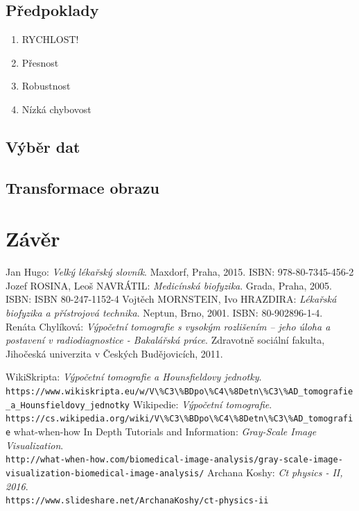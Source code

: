 \documentclass{thesis}%
\begin{document}
\section{Předpoklady}
\begin{enumerate}
\item RYCHLOST!
\item Přesnost
\item Robustnost
\item Nízká chybovost
\end{enumerate}
\section{Výběr dat }
\section{Transformace obrazu}


\chapter{Závěr}

\newpage
\listoffigures
\listoftables

\begin{thebibliography}{DUSO}
   Jan Hugo:
    \emph{Velký lékařský slovník}. Maxdorf, Praha, 2015. ISBN: 978-80-7345-456-2 
   Jozef ROSINA, Leoš NAVRÁTIL:
    \emph{Medicínská biofyzika}. Grada, Praha, 2005. ISBN: ISBN 80-247-1152-4
  Vojtěch MORNSTEIN, Ivo HRAZDIRA:
    \emph{Lékařská biofyzika a přístrojová technika}. Neptun, Brno, 2001. ISBN: 80-902896-1-4.
  Renáta Chylíková:
    \emph{Výpočetní tomografie s vysokým rozlišením – jeho úloha a postavení v radiodiagnostice - Bakalářská práce}. Zdravotně sociální fakulta, Jihočeská univerzita v Českých Budějovicích, 2011.



    WikiSkripta:
    \emph{Výpočetní tomografie a Hounsfieldovy jednotky}. \\
    \verb|https://www.wikiskripta.eu/w/V\%C3\%BDpo\%C4\%8Detn\%C3\%AD_tomografie_a_Hounsfieldovy_jednotky|
  Wikipedie:
    \emph{Výpočetní tomografie}. \\
    \verb|https://cs.wikipedia.org/wiki/V\%C3\%BDpo\%C4\%8Detn\%C3\%AD_tomografie|
  what-when-how In Depth Tutorials and Information:
    \emph{Gray-Scale Image Visualization}. \\
    \verb|http://what-when-how.com/biomedical-image-analysis/gray-scale-image-visualization-biomedical-image-analysis/|
Archana Koshy:
    \emph{Ct physics - II, 2016}.\\
    \verb|https://www.slideshare.net/ArchanaKoshy/ct-physics-ii|

\end{thebibliography}
  
%
\end{document}
